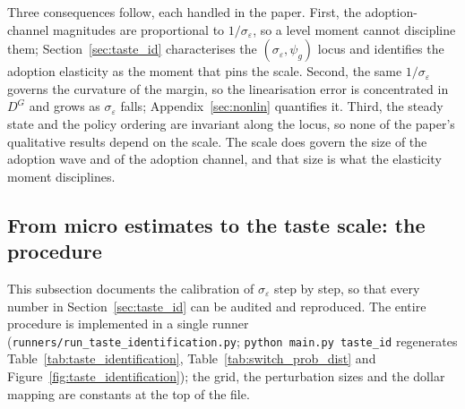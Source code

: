 

Three consequences follow, each handled in the paper. First, the adoption-channel
magnitudes are proportional to $1/\sigma_\varepsilon$, so a level moment cannot
discipline them; Section~\ref{sec:taste_id} characterises the
$(\sigma_\varepsilon,\psi_g)$ locus and identifies the adoption elasticity as the
moment that pins the scale. Second, the same $1/\sigma_\varepsilon$ governs the
curvature of the margin, so the linearisation error is concentrated in $D^{G}$
and grows as $\sigma_\varepsilon$ falls; Appendix~\ref{sec:nonlin} quantifies it.
Third, the steady state and the policy ordering are invariant along the locus, so
none of the paper's qualitative results depend on the scale. The scale does govern the size of the adoption wave and of the adoption
channel, and that size is what the elasticity moment disciplines.

\subsection{From micro estimates to the taste scale: the procedure}
\label{app:taste_procedure}

This subsection documents the calibration of $\sigma_\varepsilon$ step by step,
so that every number in Section~\ref{sec:taste_id} can be audited and
reproduced. The entire procedure is implemented in a single runner
(\texttt{runners/run\_taste\_identification.py}; \texttt{python main.py
taste\_id} regenerates Table~\ref{tab:taste_identification},
Table~\ref{tab:switch_prob_dist} and Figure~\ref{fig:taste_identification});
the grid, the perturbation sizes and the dollar mapping are constants at the top
of the file.

